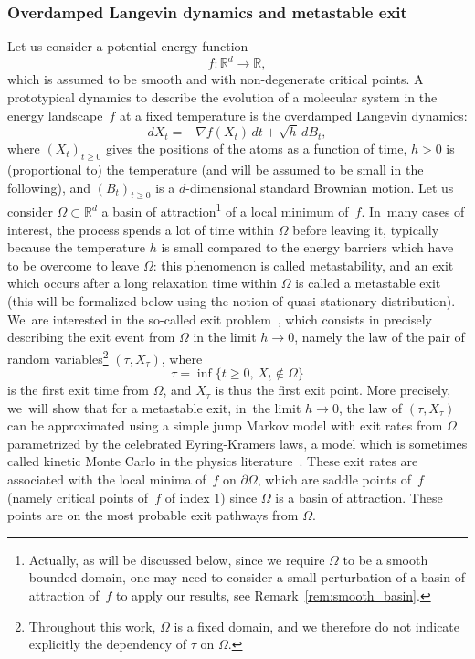 \documentclass[JEP,XML,SOM,Unicode,NoEqCountersInSection,NoFloatCountersInSection,published]{cedram}
\theoremstyle{plain}
\theoremstyle{definition}
\begin{document}
\subsubsection*{Overdamped Langevin dynamics and metastable exit} Let us consider a
potential energy function
\[
f:\mathbb R^d \to \mathbb R,
\]
which is assumed to be smooth and with non-degenerate critical points.
A prototypical dynamics to describe the evolution of a molecular
system in the energy landscape~$f$ at a fixed temperature is the
overdamped Langevin dynamics:
\begin{equation}\label{eq.langevin}
dX_t=-\nabla f(X_t) \, dt +\sqrt h \, dB_t,
\end{equation}
where $(X_t)_{t\ge 0}$ gives the positions of the atoms as a function
of time, $h>0$ is (proportional to) the temperature (and will be assumed to be small in the following),
and $(B_t)_{t\ge 0}$ is a $d$-dimensional standard Brownian
motion. Let us consider $\Omega \subset \mathbb R^d$ a basin of
attraction\footnote{\label{fn:1}Actually, as will be discussed below, since we
require $\Omega$ to be a smooth bounded domain, one may need to
consider a small perturbation of a basin of attraction of~$f$ to
apply our results, see Remark~\ref{rem:smooth_basin}.} of a local
minimum of~$f$. In~many cases of interest, the process spends a lot
of time within $\Omega$ before leaving it, typically because
the temperature $h$ is
small compared to the energy barriers which have to be overcome to
leave $\Omega$: this phenomenon is called metastability, and an exit
which occurs after a long relaxation time within $\Omega$ is called a
metastable exit (this will be formalized below using the notion of
quasi-stationary distribution). We~are interested in the so-called exit
problem~\cite{FrWe}, which consists in
precisely describing the exit event from $\Omega$ in the limit $h\to 0$, namely the law of the pair of random
variables\footnote{Throughout this work, $\Omega$ is a fixed domain, and
we therefore do not indicate explicitly the dependency of $\tau$
on $\Omega$.}
$(\tau,X_{\tau})$, where
\begin{equation}\label{eq:tau}
\tau=\inf\{t\ge 0, \, X_t\notin \Omega\}
\end{equation}
is the first exit time from $\Omega$, and $X_\tau$ is thus the first
exit point.
More precisely, we~will show that for a metastable exit, in~the limit
$h \to 0$, the law of $(\tau,X_{\tau})$ can be
approximated using a simple jump Markov model with exit rates from
$\Omega$ parametrized by the celebrated Eyring-Kramers laws, a model
which is sometimes called kinetic Monte Carlo in the physics
literature~\cite{voter-05}. These exit rates are associated with the
local minima of~$f$ on $\partial \Omega$, which are saddle points of~$f$ (namely critical points of~$f$ of index $1$) since $\Omega$ is a
basin of attraction. These points are on the most probable exit pathways from $\Omega$.
\end{document}
